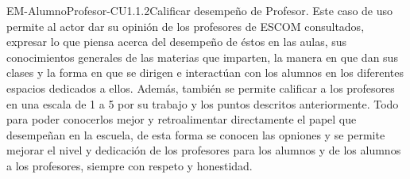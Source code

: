 \begin{UseCase}{EM-AlumnoProfesor-CU1.1.2}{Calificar desempeño de Profesor.}{
	\noindent
	Este caso de uso permite al actor dar su opinión de los profesores de ESCOM consultados, expresar lo que piensa acerca del desempeño de éstos en las aulas, sus conocimientos generales de las materias que imparten, la manera en que dan sus clases y la forma en que se dirigen e interactúan con los alumnos en los diferentes espacios dedicados a ellos. Además, también se permite calificar a los profesores en una escala de 1 a 5 por su trabajo y los puntos descritos anteriormente. Todo para poder conocerlos mejor y retroalimentar directamente el papel que desempeñan en la escuela, de esta forma se conocen las opniones y se permite mejorar el nivel y dedicación de los profesores para los alumnos y de los alumnos a los profesores, siempre con respeto y honestidad.
	\newline
	}
\end{UseCase}
